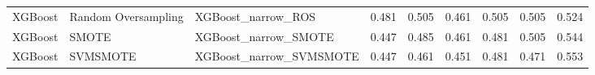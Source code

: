 \begin{tabular}{lllllllll}
                     XGBoost & Random Oversampling &                           XGBoost\_narrow\_ROS & 0.481 &                     0.505 &                 0.461 &                  0.505 &                                   0.505 &     0.524 \\
                     XGBoost &               SMOTE &                         XGBoost\_narrow\_SMOTE & 0.447 &                     0.485 &                 0.461 &                  0.481 &                                   0.505 &     0.544 \\
                     XGBoost &            SVMSMOTE &                      XGBoost\_narrow\_SVMSMOTE & 0.447 &                     0.461 &                 0.451 &                  0.481 &                                   0.471 &     0.553 \\
\bottomrule
\end{tabular}
